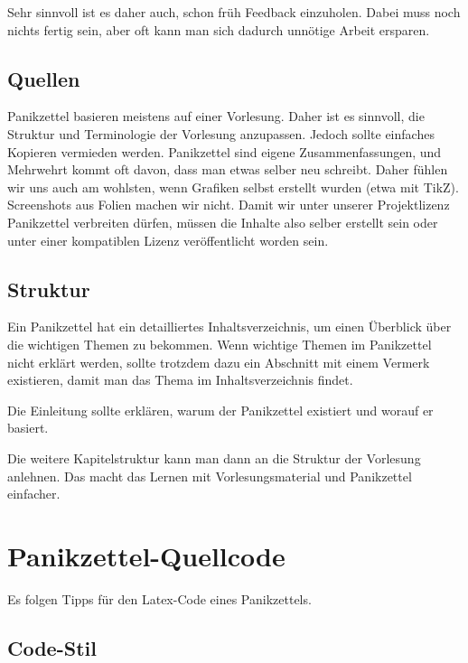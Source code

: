 \documentclass{panikzettel}
\begin{document}
Sehr sinnvoll ist es daher auch, schon früh Feedback einzuholen.
Dabei muss noch nichts fertig sein, aber oft kann man sich dadurch unnötige Arbeit ersparen.

\subsection{Quellen}

Panikzettel basieren meistens auf einer Vorlesung.
Daher ist es sinnvoll, die Struktur und Terminologie der Vorlesung anzupassen.
Jedoch sollte einfaches Kopieren vermieden werden.
Panikzettel sind eigene Zusammenfassungen, und Mehrwehrt kommt oft davon, dass man etwas selber neu schreibt.
Daher fühlen wir uns auch am wohlsten, wenn Grafiken selbst erstellt wurden (etwa mit TikZ).
Screenshots aus Folien machen wir nicht.
Damit wir unter unserer Projektlizenz Panikzettel verbreiten dürfen, müssen die Inhalte also selber erstellt sein oder unter einer kompatiblen Lizenz veröffentlicht worden sein.

\subsection{Struktur}

Ein Panikzettel hat ein detailliertes Inhaltsverzeichnis, um einen Überblick über die wichtigen Themen zu bekommen.
Wenn wichtige Themen im Panikzettel nicht erklärt werden, sollte trotzdem dazu ein Abschnitt mit einem Vermerk existieren, damit man das Thema im Inhaltsverzeichnis findet.

Die Einleitung sollte erklären, warum der Panikzettel existiert und worauf er basiert.

Die weitere Kapitelstruktur kann man dann an die Struktur der Vorlesung anlehnen.
Das macht das Lernen mit Vorlesungsmaterial und Panikzettel einfacher.

\newpage
\section{Panikzettel-Quellcode}

Es folgen Tipps für den Latex-Code eines Panikzettels.

\subsection{Code-Stil}
\end{document}
